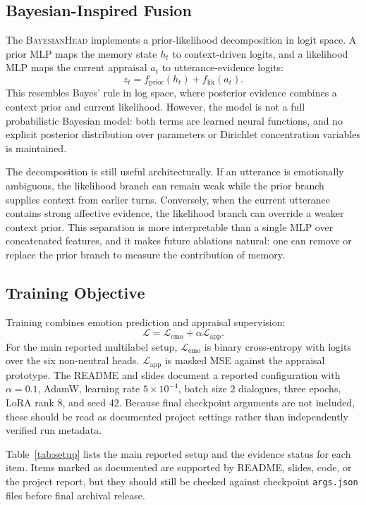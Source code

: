 \documentclass[11pt]{article}
\begin{document}
\subsection{Bayesian-Inspired Fusion}

The \textsc{BayesianHead} implements a prior-likelihood decomposition in logit space. A prior MLP maps the memory state $h_t$ to context-driven logits, and a likelihood MLP maps the current appraisal $a_t$ to utterance-evidence logits:
\[
z_t = f_{\mathrm{prior}}(h_t) + f_{\mathrm{lik}}(a_t).
\]
This resembles Bayes' rule in log space, where posterior evidence combines a context prior and current likelihood. However, the model is not a full probabilistic Bayesian model: both terms are learned neural functions, and no explicit posterior distribution over parameters or Dirichlet concentration variables is maintained.

The decomposition is still useful architecturally. If an utterance is emotionally ambiguous, the likelihood branch can remain weak while the prior branch supplies context from earlier turns. Conversely, when the current utterance contains strong affective evidence, the likelihood branch can override a weaker context prior. This separation is more interpretable than a single MLP over concatenated features, and it makes future ablations natural: one can remove or replace the prior branch to measure the contribution of memory.

\subsection{Training Objective}

Training combines emotion prediction and appraisal supervision:
\[
\mathcal{L} = \mathcal{L}_{\mathrm{emo}} + \alpha \mathcal{L}_{\mathrm{app}}.
\]
For the main reported multilabel setup, $\mathcal{L}_{\mathrm{emo}}$ is binary cross-entropy with logits over the six non-neutral heads. $\mathcal{L}_{\mathrm{app}}$ is masked MSE against the appraisal prototype. The README and slides document a reported configuration with $\alpha=0.1$, AdamW, learning rate $5\times10^{-4}$, batch size 2 dialogues, three epochs, LoRA rank 8, and seed 42. Because final checkpoint arguments are not included, these should be read as documented project settings rather than independently verified run metadata.

Table~\ref{tab:setup} lists the main reported setup and the evidence status for each item. Items marked as documented are supported by README, slides, code, or the project report, but they should still be checked against checkpoint \texttt{args.json} files before final archival release.
\end{document}
